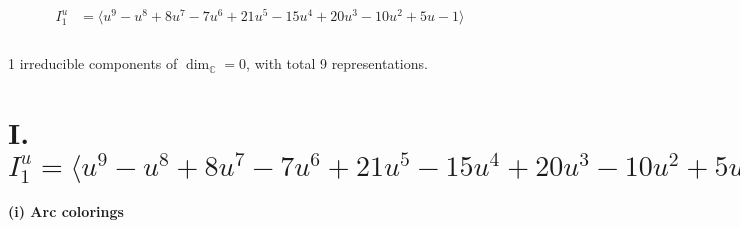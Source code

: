 \documentclass[1p]{elsarticle_modified}
\theoremstyle{definition}
\begin{document}
\begin{align*}
I^u_{1}&=\langle 
u^9- u^8+8 u^7-7 u^6+21 u^5-15 u^4+20 u^3-10 u^2+5 u-1\rangle \\
\\
\end{align*}
\raggedright * 1 irreducible components of $\dim_{\mathbb{C}}=0$, with total 9 representations.\\
\newpage
\renewcommand{\arraystretch}{1}
\centering \section*{I. $I^u_{1}= \langle u^9- u^8+8 u^7-7 u^6+21 u^5-15 u^4+20 u^3-10 u^2+5 u-1 \rangle$}
\flushleft \textbf{(i) Arc colorings}\\
\end{document}
